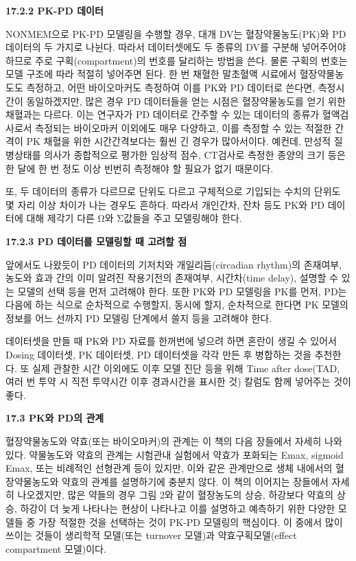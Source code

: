 \documentclass[
  10pt,
]{krantz}
\begin{document}
\textbf{17.2.2 PK-PD 데이터}

NONMEM으로 PK-PD 모델링을 수행할 경우, 대개 DV는 혈장약물농도(PK)와 PD 데이터의 두 가지로 나뉜다. 따라서
데이터셋에도 두 종류의 DV를 구분해 넣어주어야 하므로 주로 구획(compartment)의 번호를 달리하는 방법을
쓴다. 물론 구획의 번호는 모델 구조에 따라 적절히 넣어주면 된다. 한 번 채혈한 말초혈액 시료에서 혈장약물농도도
측정하고, 어떤 바이오마커도 측정하여 이를 PK와 PD 데이터로 쓴다면, 측정시간이 동일하겠지만, 많은 경우 PD
데이터들을 얻는 시점은 혈장약물농도를 얻기 위한 채혈과는 다르다. 이는 연구자가 PD 데이터로 간주할 수 있는 데이터의 종류가
혈액검사로서 측정되는 바이오마커 이외에도 매우 다양하고, 이를 측정할 수 있는 적절한 간격이 PK 채혈을 위한 시간간격보다는 훨씬
긴 경우가 많아서이다. 예컨데, 만성적 질병상태를 의사가 종합적으로 평가한 임상적 점수, CT검사로 측정한 종양의 크기 등은 한
달에 한 번 정도 이상 빈번히 측정해야 할 필요가 없기 때문이다.

또, 두 데이터의 종류가 다르므로 단위도 다르고 구체적으로 기입되는 수치의 단위도 몇 자리 이상 차이가 나는 경우도 흔하다.
따라서 개인간차, 잔차 등도 PK와 PD 데이터에 대해 제각기 다른 Ω와 Σ값들을 주고 모델링해야 한다.

\textbf{17.2.3 PD 데이터를 모델링할 때 고려할 점}

앞에서도 나왔듯이 PD 데이터의 기저치와 개일리듬(circadian rhythm)의 존재여부, 농도와 효과 간의 이미 알려진
작용기전의 존재여부, 시간차(time delay), 설명할 수 있는 모델의 선택 등을 먼저 고려해야 한다. 또한 PK와
PD 모델링을 PK를 먼저, PD는 다음에 하는 식으로 순차적으로 수행할지, 동시에 할지, 순차적으로 한다면 PK 모델의 정보를
어느 선까지 PD 모델링 단계에서 쓸지 등을 고려해야 한다.

데이터셋을 만들 때 PK와 PD 자료를 한꺼번에 넣으려 하면 혼란이 생길 수 있어서 Dosing 데이터셋, PK 데이터셋, PD
데이터셋을 각각 만든 후 병합하는 것을 추천한다. 또 실제 관찰한 시간 이외에도 이후 모델 진단 등을 위해 Time after
dose(TAD, 여러 번 투약 시 직전 투약시간 이후 경과시간을 표시한 것) 칼럼도 함께 넣어주는 것이 좋다.

\textbf{17.3 PK와 PD의 관계}

혈장약물농도와 약효(또는 바이오마커)의 관계는 이 책의 다음 장들에서 자세히 나와 있다. 약물농도와 약효의 관계는 시험관내
실험에서 약효가 포화되는 Emax, sigmoid Emax, 또는 비례적인 선형관계 등이 있지만, 이와 같은
관계만으로 생체 내에서의 혈장약물농도와 약효의 관계를 설명하기에 충분치 않다. 이 책의 이어지는 장들에서 자세히
나오겠지만, 많은 약들의 경우 그림 2와 같이 혈장농도의 상승, 하강보다 약효의 상승, 하강이 더 늦게 나타나는 현상이
나타나고 이를 설명하고 예측하기 위한 다양한 모델들 중 가장 적절한 것을 선택하는 것이 PK-PD 모델링의 핵심이다. 이
중에서 많이 쓰이는 것들이 생리학적 모델(또는 turnover 모델)과 약효구획모델(effect compartment
모델)이다.
\end{document}
